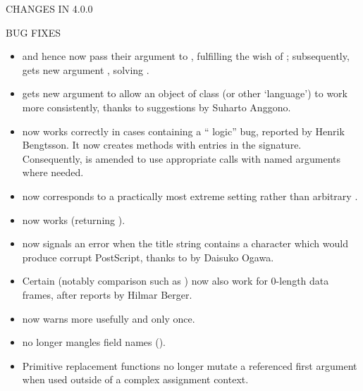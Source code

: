 \documentclass[letterpaper]{book}
\begin{document}
\begin{Section}{ CHANGES IN 4.0.0}
\begin{SubSection}{BUG FIXES}
\begin{itemize}
\item{}  and hence 
now pass their  argument to ,
fulfilling the wish of ; subsequently,
 gets new argument , solving
.

\item{}  gets new argument  to allow
an \R{} object of class  (or other `language')
to work more consistently, thanks to suggestions by Suharto Anggono.

\item{}  now works correctly in cases containing
a ``\code{\&\&} logic'' bug, reported by Henrik Bengtsson.  It now
creates methods with  entries in the signature.
Consequently,  is amended to use
appropriate  calls with named arguments where needed.

\item{}  now corresponds to
a practically most extreme  setting rather
than arbitrary .

\item{}  now works (returning ).

\item{}  now signals an error when
the title string contains a character which would produce corrupt
PostScript, thanks to  by Daisuko Ogawa.

\item{} Certain  (notably comparison such as \code{==}) now
also work for 0-length data frames, after reports by Hilmar Berger.

\item{}  now warns more usefully
and only once.

\item{}  no longer mangles field names ().

\item{} Primitive replacement functions no longer mutate a
referenced first argument when used outside of a complex
assignment context.


\end{itemize}
\end{SubSection}
\end{Section}
\end{document}
